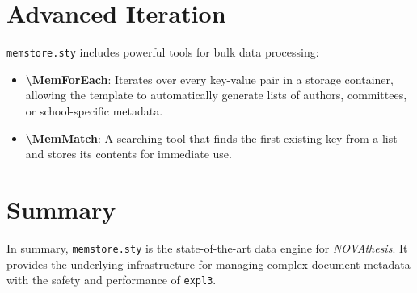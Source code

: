 \section{Advanced Iteration}
\texttt{memstore.sty} includes powerful tools for bulk data processing:
\begin{itemize}
    \item \textbf{\textbackslash MemForEach}: Iterates over every key-value pair in a storage container, allowing the template to automatically generate lists of authors, committees, or school-specific metadata.
    \item \textbf{\textbackslash MemMatch}: A searching tool that finds the first existing key from a list and stores its contents for immediate use.
\end{itemize}

\section{Summary}
In summary, \texttt{memstore.sty} is the state-of-the-art data engine for \emph{NOVAthesis}. It provides the underlying infrastructure for managing complex document metadata with the safety and performance of \texttt{expl3}.
